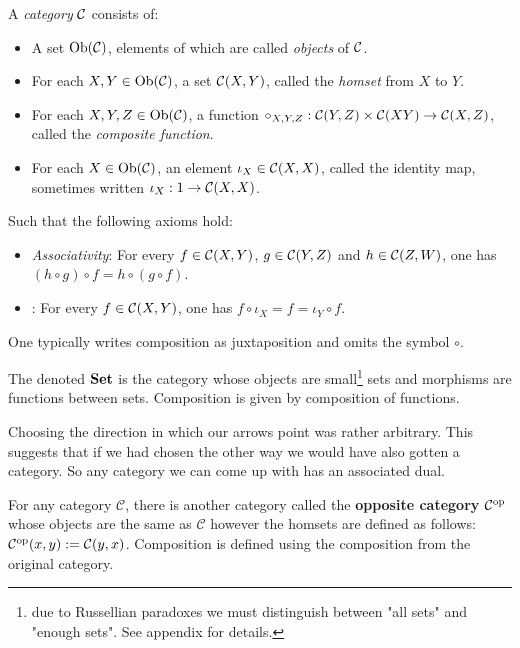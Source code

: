 \begin{defin}
    A \textit{category} $\mathcal{C}$ consists of:
    \begin{itemize}
       \item A set $\text{Ob}(\mathcal{C})$, elements of which are called \textit{objects} of $\mathcal{C}$.
       \item For each $X,Y \in \text{Ob}(\mathcal{C})$, a set $\mathcal{C}(X,Y)$, called the \textit{homset} from $X$ to $Y$.
       \item For each $X, Y, Z\in \text{Ob}(\mathcal{C})$, a function $\circ_{X,Y,Z} : \mathcal{C}(Y, Z) \times \mathcal{C} (X Y) \to \mathcal{C}(X, Z)$, called the \textit{composite function}.
       \item For each $X \in \text{Ob}(\mathcal{C})$, an element $\iota_X \in \mathcal{C}(X,X)$, called the identity map, sometimes written $\iota_X : 1 \to \mathcal{C}(X, X)$.
    \end{itemize}
    Such that the following axioms hold:
    \begin{itemize}
        \item \textit{Associativity}: For every $f \in \mathcal{C}(X,Y)$, $g \in \mathcal{C}(Y,Z)$ and $h \in \mathcal{C}(Z, W)$, one has $(h \circ g ) \circ f = h \circ (g \circ f)$.
        \item {}: For every $f \in \mathcal{C}(X, Y)$, one has $f \circ \iota_X = f = \iota_Y \circ f$.
    \end{itemize}
\end{defin}

\begin{remark}
    One typically writes composition as juxtaposition and omits the symbol $\circ$.
\end{remark}

\begin{example}
	The  denoted ${\normalfont\textbf{Set}}$ is the category whose objects are small\footnote{due to Russellian paradoxes we must distinguish between "all sets" and "enough sets". See appendix for details. } sets and morphisms are functions between sets. Composition is given by composition of functions. 
\end{example}

Choosing the direction in which our arrows point was rather arbitrary. This suggests that if we had chosen the other way we would have also gotten a category. So any category we can come up with has an associated dual.

\begin{example}
	For any category $\mathcal{C}$, there is another category called the {\bf opposite category} $\mathcal{C}^{\text{op}}$ whose objects are the same as $\mathcal{C}$ however the homsets are defined as follows: $\mathcal{C}^{\text{op}}(x,y):=\mathcal{C}(y,x)$. Composition is defined using the composition from the original category.
\end{example}

